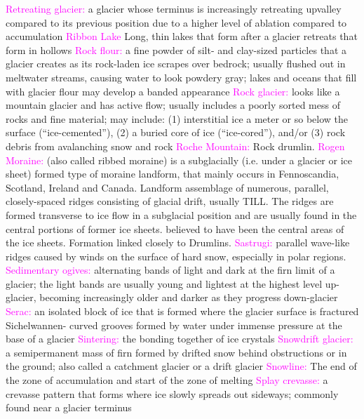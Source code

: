 \documentclass{article}
\newcommand{\pink}[1]{\textcolor{magenta}{#1}}
\newcommand{\vocab}[1]{{\pink{#1}}}
\begin{document}
\begin{multicols*}{4}
		\vocab{        Retreating glacier: } a glacier whose terminus is increasingly retreating upvalley compared to its previous position due to a higher level of ablation compared to accumulation 
		\vocab{Ribbon Lake} Long, thin lakes that form after a glacier retreats that form in hollows  
		\vocab{        Rock flour: } a fine powder of silt- and clay-sized particles that a glacier creates as its rock-laden ice scrapes over bedrock; usually flushed out in meltwater streams, causing water to look powdery gray; lakes and oceans that fill with glacier flour may develop a banded appearance 
		\vocab{        Rock glacier: } looks like a mountain glacier and has active flow; usually includes a poorly sorted mess of rocks and fine material; may include: (1) interstitial ice a meter or so below the surface (“ice-cemented”), (2) a buried core of ice (“ice-cored”), and/or (3) rock debris from avalanching snow and rock 
		\vocab{Roche Mountain: } Rock drumlin. 
		\vocab{        Rogen Moraine: }(also called ribbed moraine) is a subglacially (i.e. under a glacier or ice sheet) formed type of moraine landform, that mainly occurs in Fennoscandia, Scotland, Ireland and Canada. Landform assemblage of numerous, parallel, closely-spaced ridges consisting of glacial drift, usually TILL. The ridges are formed transverse to ice flow in a subglacial position and are usually found in the central portions of former ice sheets. believed to have been the central areas of the ice sheets. Formation linked closely to Drumlins.  
		\vocab{        Sastrugi: } parallel wave-like ridges caused by winds on the surface of hard snow, especially in polar regions.  
		\vocab{        Sedimentary ogives: } alternating bands of light and dark at the firn limit of a glacier; the light bands are usually young and lightest at the highest level up-glacier, becoming increasingly older and darker as they progress down-glacier 
		\vocab{        Serac: } an isolated block of ice that is formed where the glacier surface is fractured 
		\vocab{ }        Sichelwannen- curved grooves formed by water under immense pressure at the base of a glacier  
		\vocab{        Sintering: } the bonding together of ice crystals 
		\vocab{        Snowdrift glacier: } a semipermanent mass of firn formed by drifted snow behind obstructions or in the ground; also called a catchment glacier or a drift glacier 
		\vocab{Snowline: } The end of the zone of accumulation and start of the zone of melting  
		\vocab{        Splay crevasse: } a crevasse pattern that forms where ice slowly spreads out sideways; commonly found near a glacier terminus 

\end{multicols*}
\end{document}
